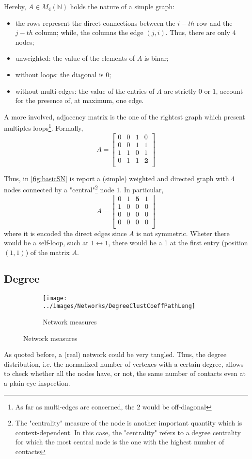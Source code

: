\documentclass[a4paper,10pt,twoside]{book} %
\theoremstyle{definition}
\begin{document}
Hereby, $A \in M_4(\mathbb{N})$ holds the nature of a simple graph:
\begin{itemize}[noitemsep]
	\item the rows represent the direct connections between the $i-th$ row and the $j-th$ column; while, the columns the edge $(j,i)$. Thus, there are only 4 nodes;
	\item unweighted: the value of the elements of $A$ is binar;
	\item without loops: the diagonal is $0$;
	\item without multi-edges: the value of the entries of $A$ are strictly $0$ or $1$, account for the presence of, at maximum, one edge.
\end{itemize}

A more involved, adjacency matrix is the one of the rightest graph which present multiples loops\footnote{As far as multi-edges are concerned, the $2$ would be off-diagonal}.
Formally,
\[
A = 
\begin{bmatrix}
0 & 0 & 1 & 0 \\
0 & 0 & 1 & 1 \\
1 & 1 & 0 & 1 \\
0 & 1 & 1 & \textbf{2} \\
\end{bmatrix}
\]

Thus, in \autoref{fig:basicSN} is report a (simple) weighted and directed graph with 4 nodes connected by a "central"\footnote{The "centrality" measure of the node is another important quantity which is context-dependent. In this case, the "centrality" refers to a degree centrality for which the most central node is the one with the highest number of contacts} node $1$.
In particular,
\[
A = 
\begin{bmatrix}
0 & 1 & \textbf{5} & 1 \\
1 & 0 & 0 & 0 \\
0 & 0 & 0 & 0 \\
0 & 0 & 0 & 0 \\ 
\end{bmatrix}
\]
where it is encoded the direct edges since $A$ is not symmetric. Wheter there would be a self-loop, such at $ 1 \longleftrightarrow 1 $, there would be a 1 at the first entry (position $(1,1)$) of the matrix $A$.

\subsection{Degree}

\begin{figure}[ht]
    \begin{subfigure}{\textwidth}
        \texttt{[image: ../images/Networks/DegreeClustCoeffPathLeng]}
        \centering
        \caption{Network measures \cite{Olaf:2011_NonRandomBrain}}
        \label{fig:degree_clustcoefficient_pathlength}
    \end{subfigure}
\end{figure}
As quoted before, a (real) network could be very tangled. Thus, the degree distribution, i.e. the normalized number of vertexes with a certain degree, allows to check whether all the nodes have, or not, the same number of contacts even at a plain eye inspection. 
\end{document}
